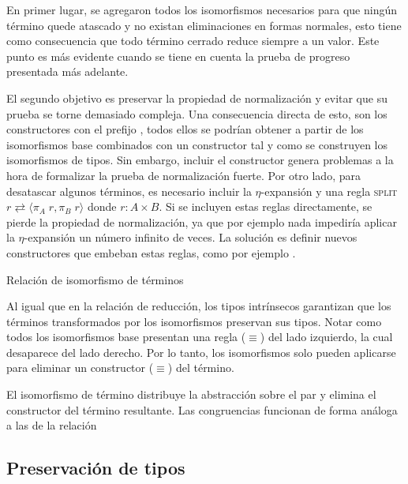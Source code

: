 En primer lugar, se agregaron todos los isomorfismos necesarios para que ningún término quede atascado y no existan eliminaciones en formas normales, esto tiene como consecuencia que todo término cerrado reduce siempre a un valor.
Este punto es más evidente cuando se tiene en cuenta la prueba de progreso presentada más adelante.

El segundo objetivo es preservar la propiedad de normalización y evitar que su prueba se torne demasiado compleja.
Una consecuencia directa de esto, son los constructores con el prefijo , todos ellos se podrían obtener a partir de los isomorfismos base combinados con un constructor  tal y como se construyen los isomorfismos de tipos.
Sin embargo, incluir el constructor  genera problemas a la hora de formalizar la prueba de normalización fuerte.
Por otro lado, para desatascar algunos términos, es necesario incluir la $\eta$-expansión y una regla \textsc{split} $r \rightleftarrows \langle \pi_A\; r , \pi_B\; r \rangle$ donde $r: A \times B$.
Si se incluyen estas reglas directamente, se pierde la propiedad de normalización, ya que por ejemplo nada impediría aplicar la $\eta$-expansión un número infinito de veces.
La solución es definir nuevos constructores que embeban estas reglas, como por ejemplo .


\begin{codigo}
	Relación de isomorfismo de términos
	
\end{codigo}

Al igual que en la relación de reducción, los tipos intrínsecos garantizan que los términos transformados por los isomorfismos preservan sus tipos.
Notar como todos los isomorfismos base presentan una regla ($\equiv$) del lado izquierdo, la cual desaparece del lado derecho.
Por lo tanto, los isomorfismos solo pueden aplicarse para eliminar un constructor ($\equiv$) del término.


\begin{example}
	El isomorfismo de término  distribuye la abstracción sobre el par y elimina el constructor  del término resultante.
	Las congruencias funcionan de forma análoga a las de la relación \type{$\_\hookrightarrow\_$}
\end{example}

\subsection{Preservación de tipos}

